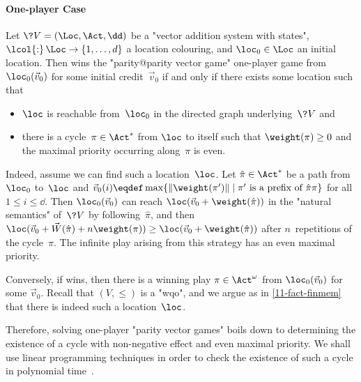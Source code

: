 \paragraph{One-player Case}
Let $\?V=(\Loc,\Act,\dd)$ be a "vector addition system with states",
$\lcol{:}\,\Loc\to\{1,\dots,d\}$ a location colouring, and
$\loc_0\in\Loc$ an initial location.  Then \Eve wins the
"parity@parity vector game" one-player game from~$\loc_0(\vec v_0)$
for some initial credit~$\vec v_0$ if and only if there exists some
location such that
\begin{itemize}
\item $\loc$ is reachable from~$\loc_0$ in the directed graph
  underlying~$\?V$ and
\item there is a cycle~$\pi\in\Act^\ast$ from $\loc$ to itself such
  that $\weight(\pi)\geq 0$ and the maximal priority occurring
  along~$\pi$ is even.
\end{itemize}
Indeed, assume we can find such a location~$\loc$.  Let
$\hat\pi\in\Act^\ast$ be a path from~$\loc_0$ to~$\loc$ and $\vec
v_0(i)\eqdef\max\{\|\weight(\pi')\|\mid\pi'\text{ is a prefix of
}\hat\pi\pi\}$ for all $1\leq i\leq\dd$.  Then $\loc_0(\vec v_0)$ can
reach $\loc(\vec v_0+\weight(\hat\pi))$ in the "natural semantics"
of~$\?V$ by following~$\hat\pi$, and then $\loc(\vec v_0+\vec
W(\hat\pi)+n\weight(\pi))\geq \loc(\vec v_0+\weight(\hat\pi))$ after
$n$~repetitions of the cycle~$\pi$.  The infinite play arising from
this strategy has an even maximal priority.

Conversely, if \Eve wins, then there is a winning play
$\pi\in\Act^\omega$ from $\loc_0(\vec v_0)$ for some $\vec v_0$.
Recall that $(V,{\leq})$ is a "wqo", and we argue as in
\cref{11-fact-finmem} that there is indeed such a location~$\loc$.

\medskip
Therefore, solving one-player "parity vector games" boils down to
determining the existence of a cycle with non-negative effect and even
maximal priority.  We shall use linear programming techniques in order
to check the existence of such a cycle in polynomial
time~\cite{Kosaraju&Sullivan:1988}.

